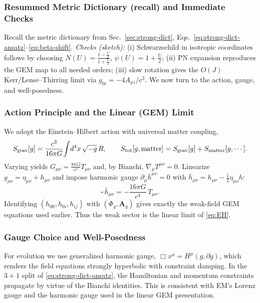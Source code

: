 \subsubsection{Resummed Metric Dictionary (recall) and Immediate Checks}
\label{sec:resummed-dict}
Recall the metric dictionary from Sec.~\ref{sec:strong-dict},
Eqs.~\eqref{eq:strong-dict-ansatz}--\eqref{eq:beta-shift}.
\emph{Checks (sketch):} (i) Schwarzschild in isotropic coordinates follows by choosing
$N(U)=\frac{1-\tfrac{U}{2}}{1+\tfrac{U}{2}}$, $\psi(U)=1+\frac{U}{2}$; (ii) PN expansion reproduces the GEM map to all needed orders; (iii) slow rotation gives the $O(J)$ Kerr/Lense--Thirring limit via $g_{0i}=-4A_{g\,i}/c^3$.
We now turn to the action, gauge, and well-posedness.

\subsubsection{Action Principle and the Linear (GEM) Limit}
\label{sec:EH-closure}
\label{sec:action-linear}
We adopt the Einstein–Hilbert action with universal matter coupling,
\begin{equation}
S_{\rm grav}[g]=\frac{c^3}{16\pi G}\!\int \! d^4x\,\sqrt{-g}\,R,\qquad
S_{\rm tot}[g,\text{matter}]=S_{\rm grav}[g]+S_{\rm matter}[g,\cdots].
\label{eq:EH}
\end{equation}
Varying yields $G_{\mu\nu}=\tfrac{8\pi G}{c^4}T_{\mu\nu}$ and, by Bianchi, $\nabla_\mu T^{\mu\nu}=0$.
Linearize $g_{\mu\nu}=\eta_{\mu\nu}+h_{\mu\nu}$ and impose harmonic gauge $\partial_\mu \bar h^{\mu\nu}=0$ with $\bar h_{\mu\nu}\!=\!h_{\mu\nu}-\tfrac12\eta_{\mu\nu}h$:
\begin{equation}
\square\,\bar h_{\mu\nu}=-\frac{16\pi G}{c^4}\,T_{\mu\nu}.
\label{eq:lin_ein}
\end{equation}
Identifying $(h_{00},h_{0i},h_{ij})$ with $(\Phi_g,\mathbf A_g)$ gives exactly the weak-field GEM equations used earlier. Thus the weak sector is the linear limit of \eqref{eq:EH}.

\subsubsection{Gauge Choice and Well-Posedness}
\label{sec:gauge}
For evolution we use generalized harmonic gauge, $\Box x^\mu=H^\mu(g,\partial g)$, which renders the field equations strongly hyperbolic with constraint damping. In the $3\!+\!1$ split of \eqref{eq:strong-dict-ansatz}, the Hamiltonian and momentum constraints propagate by virtue of the Bianchi identities. This is consistent with EM’s Lorenz gauge and the harmonic gauge used in the linear GEM presentation.

